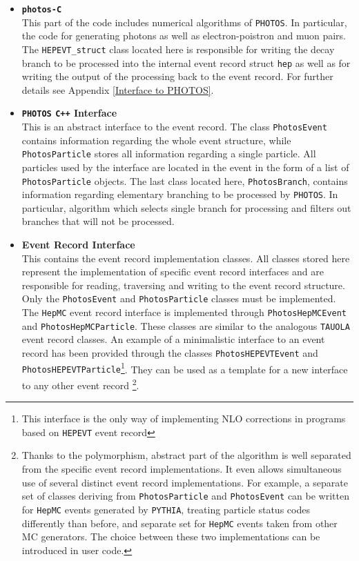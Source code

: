 \documentclass[]{Photos_interface_design}
\begin{document}
\begin{itemize}
  \item {\bf {\tt photos-C} }\\
       This part of the code includes numerical algorithms of {\tt PHOTOS}. In particular,
       the code for generating photons as well as electron-poistron and muon pairs.
       The {\tt HEPEVT\_struct} class located here is responsible for writing
       the decay branch to be processed into the internal event record struct {\tt hep} as
       well as for writing the output of the processing back to the event record.
       For further details see Appendix \ref{Interface to PHOTOS}.
  \item {\bf {\tt PHOTOS} {\tt C++} Interface} \\
       This is an abstract interface to the event record.
       The class {\tt PhotosEvent} contains information regarding the whole event
       structure, while {\tt PhotosParticle} stores all information regarding a single particle.
       All particles used by the interface are located in the event in the form of
       a list of {\tt PhotosParticle} objects.
       The last class located here, {\tt PhotosBranch}, contains information regarding
       elementary branching to be processed by {\tt PHOTOS}. In particular, algorithm
       which selects single branch for processing and filters out branches that will not be processed.
  \item {\bf Event Record Interface} \\
       This contains the event record implementation classes. All classes stored here represent
       the implementation of specific event record interfaces and are responsible for reading,
       traversing and writing to the event record structure.
       Only the {\tt PhotosEvent} and {\tt PhotosParticle} classes must be implemented.
       The {\tt HepMC} event record interface is implemented
       through {\tt PhotosHepMCEvent} and {\tt PhotosHepMCParticle}. These classes are similar to the
       analogous {\tt TAUOLA} \cite{Davidson:2010rw} event record classes.
       An example of a minimalistic interface to an event record has been provided
       through the classes {\tt PhotosHEPEVTEvent} and {\tt PhotosHEPEVTParticle}\footnote{This interface is the only way of implementing NLO corrections in programs based on {\tt HEPEVT} event record}.
       They can be used as a template for a new interface to any other event record%
       \footnote{Thanks to the polymorphism, abstract part of the algorithm
       is well separated from the specific event record implementations.
       It even allows simultaneous use of several distinct event record implementations.
       For example, a separate set of classes deriving from {\tt PhotosParticle} and {\tt PhotosEvent}
       can be written for {\tt HepMC} events generated by {\tt PYTHIA}, treating particle status codes
       differently than before, and separate set for {\tt HepMC} events taken from other MC generators.
       The choice between these two implementations can be introduced in user code.}.
\end{itemize}
\end{document}
